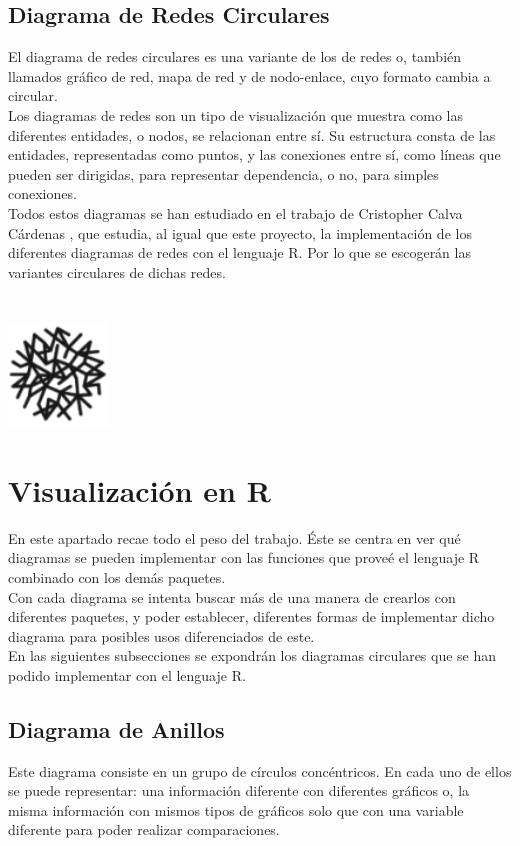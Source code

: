 \documentclass{article}\usepackage[]{graphicx}\usepackage[]{color}
\begin{document}
\subsection{Diagrama de Redes Circulares}
El diagrama de redes circulares es una variante de los de redes o, tambi\'en llamados gr\'afico de red, mapa de red y de nodo-enlace, cuyo formato cambia a circular.~\\
Los diagramas de redes son un tipo de visualizaci\'on que muestra como las diferentes entidades, o nodos, se relacionan entre s\'i. Su estructura consta de las entidades, representadas como puntos, y las conexiones entre s\'i, como l\'ineas que pueden ser dirigidas, para representar dependencia, o no, para simples conexiones.~\\
Todos estos diagramas se han estudiado en el trabajo de Cristopher Calva C\'ardenas\cite{tfg}
, que estudia, al igual que este proyecto, la implementaci\'on de los diferentes diagramas de redes con el lenguaje R. Por lo que se escoger\'an las variantes circulares de dichas redes. 
~\\~\\~\\
\vbox{
    \centering
    \includegraphics[width=0.2\textwidth]{imag/redes}
}
\clearpage
\section{Visualizaci\'on en R}
En este apartado recae todo el peso del trabajo. \'Este se centra en ver qu\'e diagramas se pueden implementar con las funciones que prove\'e el lenguaje R combinado con los dem\'as paquetes.~\\
Con cada diagrama se intenta buscar m\'as de una manera de crearlos con diferentes paquetes, y poder establecer, diferentes formas de implementar dicho diagrama para posibles usos diferenciados de este.~\\
En las siguientes subsecciones se expondr\'an los diagramas circulares que se han podido implementar con el lenguaje R.
\subsection{Diagrama de Anillos}\label{ssec:anillos}
Este diagrama consiste en un grupo de c\'irculos conc\'entricos. En cada uno de ellos se puede representar: una informaci\'on diferente con diferentes gr\'aficos o, la misma informaci\'on con mismos tipos de gr\'aficos solo que con una variable diferente para poder realizar comparaciones.
\end{document}
